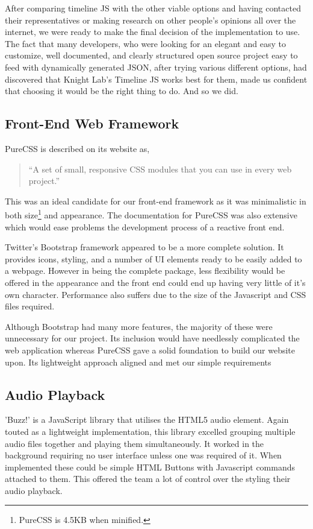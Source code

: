 \documentclass{l3proj}
\begin{document}
After comparing timeline JS with the other viable options and having contacted their representatives or making research on other people's opinions all over the internet, we were ready to make the final decision of the implementation to use. The fact that many developers, who were looking for an elegant and easy to customize, well documented, and clearly structured open source project easy to feed with dynamically generated JSON, after trying various different options, had discovered that Knight Lab’s Timeline JS works best for them, made us confident that choosing it would be the right thing to do. And so we did.



\subsection{Front-End Web Framework}

PureCSS is described on its website as,

\blockquote{“A set of small, responsive CSS modules that you can use in every web project.”}

This was an ideal candidate for our front-end framework as it was minimalistic in both size\footnote{PureCSS is 4.5KB when minified.} and appearance. The documentation for PureCSS was also extensive which would  ease problems the development process of a reactive front end.

Twitter's Bootstrap framework appeared to be a more complete solution. It provides icons, styling, and a number of UI elements ready to be easily added to a webpage. However in being the complete package, less flexibility would be offered in the appearance and the front end could end up having very little of it's own character. Performance also suffers due to the size of the Javascript and CSS files required.

Although Bootstrap had many more features, the majority of these were unnecessary for our project. Its inclusion would have needlessly complicated the web application whereas PureCSS gave a solid foundation to build our website upon. Its lightweight approach aligned and met our simple requirements


\subsection{Audio Playback}

'Buzz!' is a JavaScript library that utilises the HTML5 audio element. Again touted as a lightweight implementation, this library excelled grouping multiple audio files together and playing them simultaneously. It worked in the background requiring no user interface unless one was required of it. When implemented these could be simple HTML Buttons with Javascript commands attached to them. This offered the team a lot of control over the styling their audio playback.
\end{document}
